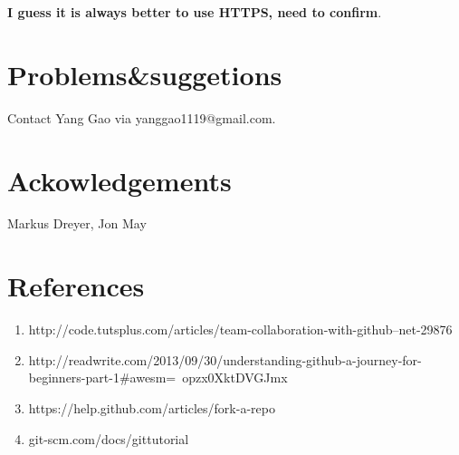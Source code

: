 \documentclass{article} %
\begin{document}
\textbf{I guess it is always better to use HTTPS, need to confirm}.

\section{Problems\&suggetions}
Contact Yang Gao via yanggao1119@gmail.com.

\section{Ackowledgements}
Markus Dreyer, Jon May

\section{References}

\begin{enumerate}
\item http://code.tutsplus.com/articles/team-collaboration-with-github--net-29876
\item http://readwrite.com/2013/09/30/understanding-github-a-journey-for-beginners-part-1\#awesm=~opzx0XktDVGJmx
\item https://help.github.com/articles/fork-a-repo
\item git-scm.com/docs/gittutorial
\end{enumerate}
\end{document}
